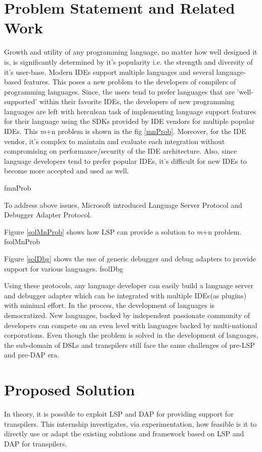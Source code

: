 \documentclass[dvipsnames]{article}
\newcommand{\loadFig}[1]{{%
  \expandafter\let\csname if#1\endcsname\iftrue%
  }
}%
\begin{document}
\section{Problem Statement and Related Work}
Growth and utility of any programming language, no matter how well designed it is, is significantly determined by it's popularity i.e. the strength and diversity of it's user-base.
Modern IDEs support multiple languages and several language-based features.
This poses a new problem to the developers of compilers of programming languages.
Since, the users tend to prefer languages that are 'well-supported' within their favorite IDEs, the developers of new programming languages are left with herculean task of implementing language support features for their language using the SDKs provided by IDE vendors for multiple popular IDEs.
This {\textit m+n} problem is shown in the fig \ref{mnProb}.
Moreover, for the IDE vendor, it's complex to maintain and evaluate each integration without compromising on performance/security of the IDE architecture.
Also, since language developers tend to prefer popular IDEs, it's difficult for new IDEs to become more accepted and used as well.

\loadFig{mnProb}

To address above issues, Microsoft introduced Language Server Protocol and Debugger Adapter Protocol.

Figure \ref{solMnProb} shows how LSP can provide a solution to {\textit m+n} problem.
\loadFig{solMnProb}

Figure \ref{solDbg} shows the use of generic debugger and debug adapters to provide support for various languages.
\loadFig{solDbg}

Using these protocols, any language developer can easily build a language server and debugger adapter which can be integrated with multiple IDEs(as plugins) with minimal effort.
In the process, the development of languages is democratized.
New languages, backed by independent passionate community of developers can compete on an even level with languages backed by multi-national corporations.
Even though the problem is solved in the development of languages, the sub-domain of DSLs and transpilers still face the same challenges of pre-LSP and pre-DAP era.

\section{Proposed Solution}
In theory, it is possible to exploit LSP and DAP for providing support for transpilers.
This internship investigates, via experimentation, how feasible is it to directly use or adapt the existing solutions and framework based on LSP and DAP for transpilers.
\end{document}
